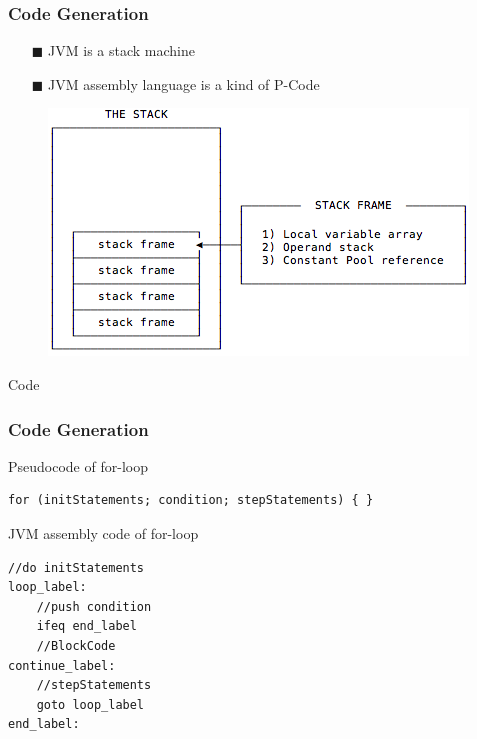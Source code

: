 \documentclass{beamer}
\begin{document}
\begin{frame}
    \frametitle{Code Generation}
        \begin{itemize}
        \item[$\blacksquare$] JVM is a stack machine
        \item[$\blacksquare$] JVM assembly language is a kind of P-Code
    \end{itemize}
    \begin{figure}[h]
        \centering
        \includegraphics[scale=0.5]{assets/JVM-stack.png}
    \end{figure}
\end{frame}

\begin{frame}[fragile]{Code}
    \frametitle{Code Generation}
    \begin{block}{Pseudocode of for-loop}
        \begin{lstlisting}[firstnumber=1, label=glabels, xleftmargin=10pt] 
for (initStatements; condition; stepStatements) { }
        \end{lstlisting}
    \end{block}
    
    \begin{block}{JVM assembly code of for-loop}
        \begin{lstlisting}[firstnumber=1, label=glabels, xleftmargin=10pt] 
   //do initStatements
loop_label:
    //push condition
    ifeq end_label
    //BlockCode
continue_label:    
    //stepStatements
    goto loop_label
end_label:
        \end{lstlisting}
    \end{block}
\end{frame}
\end{document}
